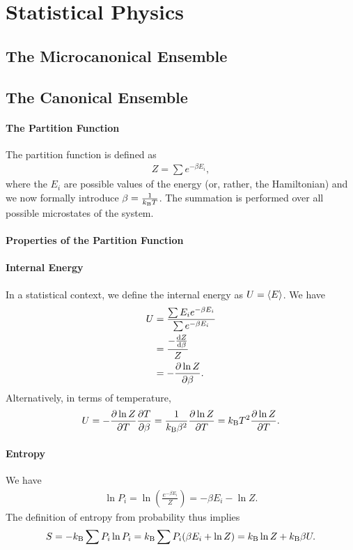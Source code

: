 \section{Statistical Physics}

\subsection{The Microcanonical Ensemble}

\subsection{The Canonical Ensemble}

\paragraph{The Partition Function}
The partition function is defined as
\begin{align*}
	Z = \sum e^{-\beta E_{i}},
\end{align*}
where the $E_{i}$ are possible values of the energy (or, rather, the Hamiltonian) and we now formally introduce $\beta = \frac{1}{k_{\text{B}} T}$. The summation is performed over all possible microstates of the system.

\paragraph{Properties of the Partition Function}

\paragraph{Internal Energy}
In a statistical context, we define the internal energy as $U = \expval{E}$. We have
\begin{align*}
	U &= \frac{\sum E_{i}e^{-\beta E_{i}}}{\sum e^{-\beta E_{i}}} \\
	  &= \frac{-\dv{Z}{\beta}}{Z} \\
	  &= -\pdv{\ln{Z}}{\beta}.
\end{align*}
Alternatively, in terms of temperature,
\begin{align*}
	U = -\pdv{\ln{Z}}{T}\pdv{T}{\beta} = \frac{1}{k_{\text{B}}\beta^{2}}\pdv{\ln{Z}}{T} = k_{\text{B}} T^{2}\pdv{\ln{Z}}{T}.
\end{align*}

\paragraph{Entropy}
We have
\begin{align*}
	\ln{P_{i}} = \ln(\frac{e^{-\beta E_{i}}}{Z}) = -\beta E_{i} - \ln{Z}.
\end{align*}
The definition of entropy from probability thus implies
\begin{align*}
	S = -k_{\text{B}}\sum P_{i}\ln{P_{i}} = k_{\text{B}}\sum P_{i}(\beta E_{i} + \ln{Z}) = k_{\text{B}}\ln{Z} + k_{\text{B}}\beta U.
\end{align*}

